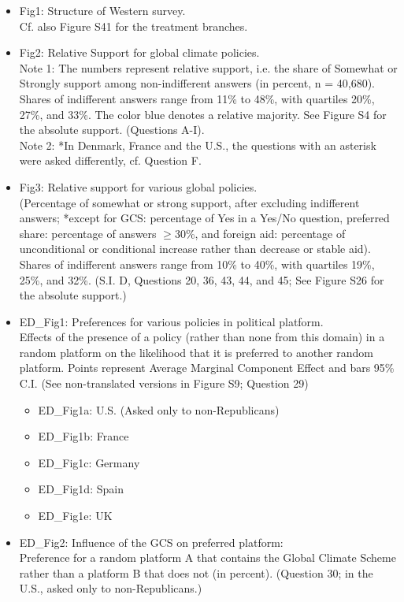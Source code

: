 \documentclass[12pt,english]{article}
\begin{document}
\begin{itemize}
  \item Fig1: Structure of Western survey.\\ Cf. also Figure S41 for the treatment branches.
  \item Fig2: Relative Support for global climate policies. \\
  Note 1: The numbers represent relative support, i.e. the share of Somewhat or Strongly support among non-indifferent answers (in percent, n = 40,680). Shares of indifferent answers range from 11\% to 48\%, with quartiles 20\%, 27\%, and 33\%. The color blue denotes a relative majority. See Figure S4 for the absolute support. (Questions A-I).\\
  Note 2: *In Denmark, France and the U.S., the questions with an asterisk were asked differently, cf. Question F.
  \item Fig3: Relative support for various global policies.\\ (Percentage of somewhat or strong support, after excluding indifferent answers; *except for GCS: percentage of Yes in a Yes/No question, preferred share: percentage of answers $\geq$30\%, and foreign aid: percentage of  unconditional or conditional increase rather than decrease or stable aid). Shares of indifferent answers range from 10\% to 40\%, with quartiles 19\%, 25\%, and 32\%. (S.I. D, %
  Questions 20, 36, 43, 44, and 45; See Figure S26 for the absolute support.)
  \item ED\_Fig1: Preferences for various policies in political platform. \\Effects of the presence of a policy (rather than none from this domain) in a random platform on the likelihood that it is preferred to another random platform. Points represent Average Marginal Component Effect and bars 95\% C.I. (See non-translated versions in Figure S9; Question 29)
  \begin{itemize}
    \item ED\_Fig1a: U.S. (Asked only to non-Republicans)
    \item ED\_Fig1b: France
    \item ED\_Fig1c: Germany
    \item ED\_Fig1d: Spain
    \item ED\_Fig1e: UK
  \end{itemize}
  \item ED\_Fig2: Influence of the GCS on preferred platform:\\ Preference for a random platform A that contains the Global Climate Scheme rather than a platform B that does not (in percent). (Question 30; in the U.S., asked only to non-Republicans.)

\end{itemize}
\end{document}
